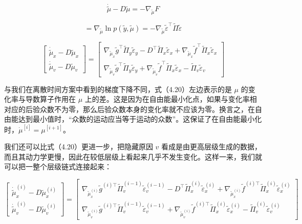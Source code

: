\begin{equation}
\dot{\tilde{\mu}} - D\tilde{\mu} = -\nabla_{\tilde{\mu}} F
\tag{4.20}
\end{equation}

\begin{equation}
= \nabla_{\tilde{\mu}} \ln p(\tilde{y}, \tilde{\mu})
= -\nabla_{\tilde{\mu}} \tilde{\varepsilon}^{\top}\tilde{\Pi}\tilde{\varepsilon}
\tag{4.20}
\end{equation}

\begin{equation}
\begin{bmatrix}
\dot{\tilde{\mu}}_x - D\tilde{\mu}_x \\
\dot{\tilde{\mu}}_v - D\tilde{\mu}_v
\end{bmatrix}
=
\begin{bmatrix}
\nabla_{\tilde{\mu}_x}\tilde{g}^{\top}\tilde{\Pi}_y\tilde{\varepsilon}_y
- D^{\top}\tilde{\Pi}_x\tilde{\varepsilon}_x
+ \nabla_{\tilde{\mu}_x}\tilde{f}^{\top}\tilde{\Pi}_x\tilde{\varepsilon}_x \\
\nabla_{\tilde{\mu}_v}\tilde{g}^{\top}\tilde{\Pi}_y\tilde{\varepsilon}_y
+ \nabla_{\tilde{\mu}_v}\tilde{f}^{\top}\tilde{\Pi}_x\tilde{\varepsilon}_x
- \tilde{\Pi}_v\tilde{\varepsilon}_v
\end{bmatrix}
\tag{4.20}
\end{equation}

与我们在离散时间方案中看到的梯度下降不同，式（4.20）左边表示的是 $\mu$ 的变化率与导数算子作用在 $\mu$ 上的差。这是因为在自由能最小化点，如果与变化率相对应的后验众数不为零，那么后验众数本身的变化率就不应该为零。换言之，在自由能达到最小值时，“众数的运动应当等于运动的众数”。这保证了在自由能最小化时，$\dot{\mu}^{[i]} = \mu^{[i+1]}$。

我们还可以比式（4.20）更进一步，把隐藏原因 $v$ 看成是由更高层级生成的数据，而且其动力学更慢，因此在较低层级上看起来几乎不发生变化。这样一来，我们就可以把一整个层级链式连接起来：

\begin{equation}
\begin{bmatrix}
\dot{\tilde{\mu}}_x^{(i)} - D\tilde{\mu}_x^{(i)} \\
\dot{\tilde{\mu}}_v^{(i)} - D\tilde{\mu}_v^{(i)}
\end{bmatrix}
=
\begin{bmatrix}
\nabla_{\tilde{\mu}_x^{(i)}}\tilde{g}^{(i)\top}\tilde{\Pi}_v^{(i-1)}\tilde{\varepsilon}_v^{(i-1)}
- D^{\top}\tilde{\Pi}_x^{(i)}\tilde{\varepsilon}_x^{(i)}
+ \nabla_{\tilde{\mu}_x^{(i)}} \tilde{f}^{(i)\top}\tilde{\Pi}_x^{(i)}\tilde{\varepsilon}_x^{(i)} \\
\nabla_{\tilde{\mu}_v^{(i)}}\tilde{g}^{(i)\top}\tilde{\Pi}_v^{(i-1)}\tilde{\varepsilon}_v^{(i-1)}
+ \nabla_{\tilde{\mu}_v^{(i)}}\tilde{f}^{(i)\top}\tilde{\Pi}_x^{(i)}\tilde{\varepsilon}_x^{(i)}
- \tilde{\Pi}_v^{(i)}\tilde{\varepsilon}_v^{(i)}
\end{bmatrix}
\tag{4.21}
\end{equation}

